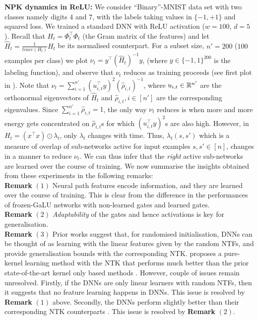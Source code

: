 \textbf{NPK dynamics in ReLU:} We consider ``Binary''-MNIST data set with two classes namely digits $4$ and $7$, with the labels taking values in $\{-1,+1\}$ and squared loss. We trained a standard DNN with ReLU activation ($w=100$, $d=5$). Recall that $H_t=\Phi^\top_t\Phi_t$  (the Gram matrix of the features) and let $\widehat{H}_t=\frac{1}{trace(H_t)}H_t$ be its normalised counterpart. For a subset size, $n'=200$ ($100$ examples per class) we plot $\nu_t=y^\top (\widehat{H}_t)^{-1} y$, (where $y\in\{-1,1\}^{200}$ is the labeling function), and observe that $\nu_t$ reduces as training proceeds (see first plot in ). Note that $\nu_t=\sum_{i=1}^{n'}(u_{i,t}^\top y)^2 (\hat{\rho}_{i,t})^{-1}$, where $u_{i,t}\in \mathbb{R}^{n'}$ are the orthonormal eigenvectors of $\widehat{H}_t$ and $\hat{\rho}_{i,t},i\in[n']$ are the corresponding eigenvalues. Since $\sum_{i=1}^{n'}\hat{\rho}_{i,t}=1$, the only way $\nu_t$ reduces is when more and more energy gets concentrated on $\hat{\rho}_{i,t}$s for which $(u_{i,t}^\top y)^2$s are also high. However, in $H_t=(x^\top x)\odot \lambda_t$, only $\lambda_t$ changes with time. Thus, $\lambda_t(s,s')$ which is a measure of overlap of sub-networks active for input examples $s,s'\in[n]$, changes in a manner to reduce $\nu_t$. We can thus infer that the \emph{right} active sub-networks are learned over the course of training. We now summarise the insights obtained from these experiments in the following remarks:\hfill\\
\textbf{Remark} $(1)$ Neural path features encode information, and they are learned over the course of training. This is clear from the difference in the performances of frozen-GaLU networks with non-learned gates and learned gates.\hfill\\
\textbf{Remark} $(2)$ \emph{Adaptability} of the gates and hence activations is key for generalisation. \hfill \\
\textbf{Remark} $(3)$ Prior works \cite{arorafine,aroraker,caogu} suggest that, for randomised initialisation, DNNs can be thought of as learning with the linear features given by the random NTFs, and provide generalisation bounds with the corresponding NTK. \cite{} proposes a pure-kernel learning method with the NTK that  performs much better than the prior state-of-the-art kernel only based methods \cite{}. However, couple of issues remain unresolved. Firstly, if the DNNs are only linear learners with random NTFs, then it suggests that no feature learning happens in DNNs. This issue is resolved by \textbf{Remark} $(1)$ above. Secondly, the DNNs perform slightly better than their corresponding NTK counterparts \cite{aroraker,lee}. This issue is resolved by \textbf{Remark} $(2)$.


